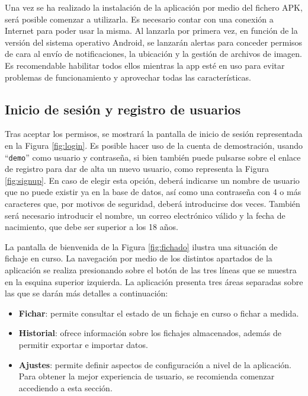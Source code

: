 Una vez se ha realizado la instalación de la aplicación por medio del fichero APK, será posible comenzar a utilizarla. Es necesario contar con una conexión a Internet para poder usar la misma. Al lanzarla por primera vez, en función de la versión del sistema operativo Android, se lanzarán alertas para conceder permisos de cara al envío de notificaciones, la ubicación y la gestión de archivos de imagen. Es recomendable habilitar todos ellos mientras la app esté en uso para evitar problemas de funcionamiento y aprovechar todas las características.

\subsection{Inicio de sesión y registro de usuarios}

Tras aceptar los permisos, se mostrará la pantalla de inicio de sesión representada en la Figura \ref{fig:login}. Es posible hacer uso de la cuenta de demostración, usando “\texttt{demo}” como usuario y contraseña, si bien también puede pulsarse sobre el enlace de registro para dar de alta un nuevo usuario, como representa la Figura \ref{fig:signup}. En caso de elegir esta opción, deberá indicarse un nombre de usuario que no puede existir ya en la base de datos, así como una contraseña con 4 o más caracteres que, por motivos de seguridad, deberá introducirse dos veces. También será necesario introducir el nombre, un correo electrónico válido y la fecha de nacimiento, que debe ser superior a los 18 años.

La pantalla de bienvenida de la Figura \ref{fig:fichado} ilustra una situación de fichaje en curso. La navegación por medio de los distintos apartados de la aplicación se realiza presionando sobre el botón de las tres líneas que se muestra en la esquina superior izquierda. La aplicación presenta tres áreas separadas sobre las que se darán más detalles a continuación:

\begin{itemize}
    \item \textbf{Fichar}: permite consultar el estado de un fichaje en curso o fichar a medida.
    \item \textbf{Historial}: ofrece información sobre los fichajes almacenados, además de permitir exportar e importar datos.
    \item \textbf{Ajustes}: permite definir aspectos de configuración a nivel de la aplicación. Para obtener la mejor experiencia de usuario, se recomienda comenzar accediendo a esta sección.
\end{itemize}

